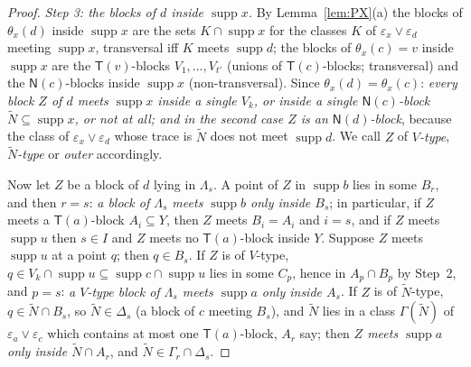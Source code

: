 \documentclass[11pt]{amsart}
\theoremstyle{definition}
\newcommand{\supp}{\operatorname{supp}}
\newcommand{\T}{\mathsf{T}}
\newcommand{\N}{\mathsf{N}}
\begin{document}
\begin{proof}
\smallskip
\emph{Step 3: the blocks of $d$ inside $\supp x$.} By Lemma~\ref{lem:PX}(a) the blocks of $\theta_x(d)$ inside $\supp x$ are the sets $K\cap\supp x$ for the classes $K$ of $\varepsilon_x\vee\varepsilon_d$ meeting $\supp x$, transversal iff $K$ meets $\supp d$; the blocks of $\theta_x(c)=v$ inside $\supp x$ are the $\T(v)$-blocks $V_1,\dots,V_{t'}$ (unions of $\T(c)$-blocks; transversal) and the $\N(c)$-blocks inside $\supp x$ (non-transversal). Since $\theta_x(d)=\theta_x(c)$: \emph{every block $Z$ of $d$ meets $\supp x$ inside a single $V_k$, or inside a single $\N(c)$-block $\tilde N\subseteq\supp x$, or not at all; and in the second case $Z$ is an $\N(d)$-block}, because the class of $\varepsilon_x\vee\varepsilon_d$ whose trace is $\tilde N$ does not meet $\supp d$. We call $Z$ of \emph{$V$-type}, \emph{$\tilde N$-type} or \emph{outer} accordingly.

Now let $Z$ be a block of $d$ lying in $\Lambda_s$. A point of $Z$ in $\supp b$ lies in some $B_r$, and then $r=s$: \emph{a block of $\Lambda_s$ meets $\supp b$ only inside $B_s$}; in particular, if $Z$ meets a $\T(a)$-block $A_i\subseteq Y$, then $Z$ meets $B_i=A_i$ and $i=s$, and if $Z$ meets $\supp u$ then $s\in I$ and $Z$ meets no $\T(a)$-block inside $Y$. Suppose $Z$ meets $\supp u$ at a point $q$; then $q\in B_s$. If $Z$ is of $V$-type, $q\in V_k\cap\supp u\subseteq\supp c\cap\supp u$ lies in some $C_p$, hence in $A_p\cap B_p$ by Step~2, and $p=s$: \emph{a $V$-type block of $\Lambda_s$ meets $\supp a$ only inside $A_s$}. If $Z$ is of $\tilde N$-type, $q\in\tilde N\cap B_s$, so $\tilde N\in\Delta_s$ (a block of $c$ meeting $B_s$), and $\tilde N$ lies in a class $\Gamma(\tilde N)$ of $\varepsilon_a\vee\varepsilon_c$ which contains at most one $\T(a)$-block, $A_r$ say; then \emph{$Z$ meets $\supp a$ only inside $\tilde N\cap A_r$}, and $\tilde N\in\Gamma_r\cap\Delta_s$.


\end{proof}
\end{document}
